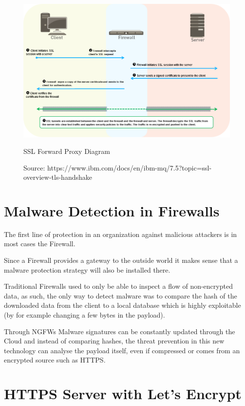 \begin{figure}[!hb]
 \centering
 \includegraphics[width=13cm]{img/ssl_decryption_diagram.png}
 \caption{SSL Forward Proxy Diagram}
 \caption*{Source: https://www.ibm.com/docs/en/ibm-mq/7.5?topic=ssl-overview-tls-handshake}
 \label{SSL Forward Diagram}
\end{figure}

\newpage

\section{Malware Detection in Firewalls}

The first line of protection in an organization against malicious attackers is in most cases the Firewall.

Since a Firewall provides a gateway to the outside world it makes sense that a malware protection strategy will also be installed there.

Traditional Firewalls used to only be able to inspect a flow of non-encrypted data, as such, the only way to detect malware was to compare the hash of the downloaded data from the client to a local database which is highly exploitable (by for example changing a few bytes in the payload).

Through NGFWs Malware signatures can be constantly updated through the Cloud and instead of comparing hashes, the threat prevention in this new technology can analyse the payload itself, even if compressed or comes from an encrypted source such as HTTPS.

\section{HTTPS Server with Let's Encrypt}

